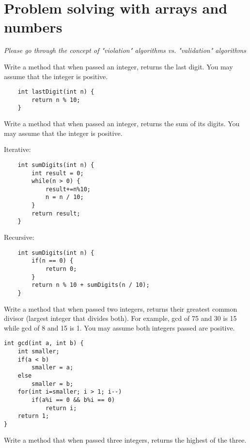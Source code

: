 \documentclass[11pt]{exam}
\begin{document}
\section{Problem solving with arrays and numbers}

\emph{Please go through the concept of "violation" algorithms vs. "validation" algorithms}

\begin{questions}

\question Write a method that when passed an integer, returns the last digit. You may assume that the integer is positive.

\begin{solution}
\begin{lstlisting}
	int lastDigit(int n) {
		return n % 10;
	}
\end{lstlisting}	
\end{solution}

\question Write a method that when passed an integer, returns the sum of its digits. You may assume that the integer is positive.

\begin{solution}
Iterative:
\begin{lstlisting}
	int sumDigits(int n) {
		int result = 0;
		while(n > 0) {
			result+=n%10;
			n = n / 10;
		}
		return result;
	}
\end{lstlisting}	

Recursive:
\begin{lstlisting}
	int sumDigits(int n) {
		if(n == 0) {
			return 0;
		}
		return n % 10 + sumDigits(n / 10);
	}
\end{lstlisting}	
\end{solution}

\question Write a method that when passed two integers, returns their greatest common divisor (largest integer that divides both). For example, gcd of 75 and 30 is 15 while gcd of 8 and 15 is 1. You may assume both integers passed are positive.

\begin{solution}
\begin{lstlisting}
int gcd(int a, int b) {
	int smaller;
	if(a < b)
		smaller = a;
	else 
		smaller = b;
	for(int i=smaller; i > 1; i--)
		if(a%i == 0 && b%i == 0)
			return i;
	return 1;
}
\end{lstlisting}	
\end{solution}


\question Write a method that when passed three integers, returns the highest of the three.


\end{questions}
\end{document}
